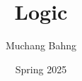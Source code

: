\documentclass{article}
\begin{document}
\title{Logic}
\author{Muchang Bahng}
\date{Spring 2025}

\maketitle
\tableofcontents
\pagebreak




\end{document}
